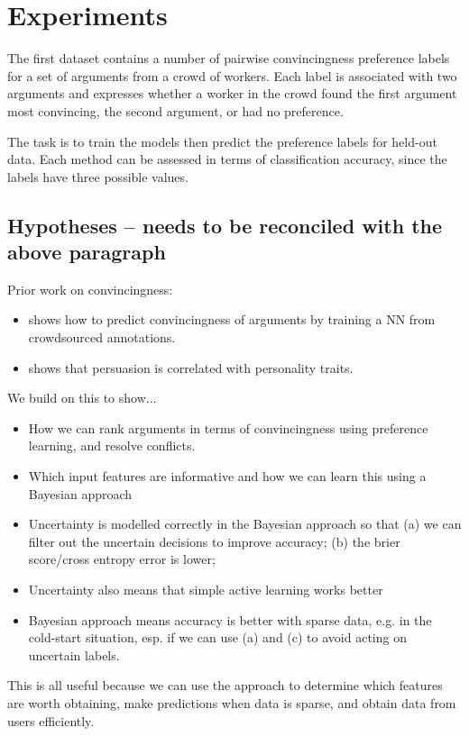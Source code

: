 \section{Experiments}\label{sec:expts}

The first dataset contains a number of pairwise convincingness preference labels for a set of arguments from a crowd of workers. Each label is associated with two arguments and expresses whether a worker in the crowd found the first argument most convincing, the second argument, or had no preference.  

The task is to train the models then predict the preference labels for held-out data. Each method can be assessed in terms of classification accuracy, since the labels have three possible values. 
\subsection{Hypotheses -- needs to be reconciled with the above paragraph} 

Prior work on convincingness:
\begin{itemize}
 \item \cite{habernal2016argument} shows how to predict convincingness of arguments by training a NN 
 from crowdsourced annotations. 
 \item \cite{lukin2017argument} shows that persuasion is correlated with personality traits.
\end{itemize}

We build on this to show...
\begin{itemize}
 \item How we can rank arguments in terms of convincingness using preference learning, and resolve
 conflicts.
 \item Which input features are informative and how we can learn this using a Bayesian approach
 \item Uncertainty is modelled correctly in the Bayesian approach so that (a) we can filter
 out the uncertain decisions to improve accuracy; (b) the brier score/cross entropy error is lower;
 \item Uncertainty also means that simple active learning works better
 \item Bayesian approach means accuracy is better with sparse data, e.g. in the cold-start situation,
  esp. if we can use (a) and (c) to avoid acting on uncertain labels.
\end{itemize}
This is all useful because we can use the approach to determine which features are worth 
obtaining, make predictions when data is sparse, and obtain data from users efficiently.

